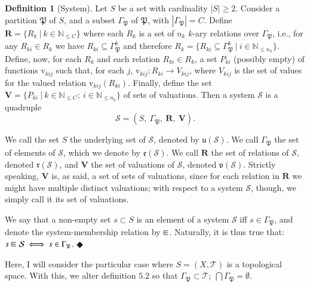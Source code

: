 \documentclass[12pt, a4paper]{article} %
\theoremstyle{definition}
\newtheorem{definition}{Definition}[section]
\newcommand{\N}{\mathbb{N}}
\newcommand\sqin{\mathrel{\raisebox{0.1ex}{\ooalign{$\sqsubset$\cr $-$}}}}
\begin{document}
	\begin{definition}[System] \label{sys} Let $S$ be a set with cardinality $|S| \geq 2$. Consider a partition $\mathfrak{P}$ of $S$, and a subset $\Gamma_{\mathfrak{P}}$ of $\mathfrak{P}$, with $|\Gamma_{\mathfrak{P}}| = C$. Define $\mathbf{R} = \{R_k \ | \ k \in \N_{\leq C} \}$ where each $R_k$ is a set of $n_k$ $k$-ary relations over $\Gamma_{\mathfrak{P}}$, i.e., for any $R_{ki} \in R_k$ we have $R_{ki} \subseteq \Gamma_{\mathfrak{P}}^k$ and therefore $R_k = \{R_{ki} \subseteq \Gamma_{\mathfrak{P}}^k\ | \ i \in \N_{\leq n_k}\}$.  Define, now, for each $R_k$ and each relation $R_{ki} \in R_k$, a set $P_{ki}$ (possibly empty) of functions $\mathrm{v}_{kij}$ such that, for each $j$, $\mathrm{v}_{kij}: R_{ki} \rightarrow V_{kij}$, where $V_{kij}$ is the set of values for the valued relation $\mathrm{v}_{kij}(R_{ki})$. Finally, define the set $\mathbf{V} = \{P_{ki} \ | \ k \in \N_{\leq C};\ i \in \N_{\leq n_k} \}$ of sets of valuations. Then a system $\mathcal{S}$ is a quadruple
		\[ \mathcal{S} = (S,\ \Gamma_{\mathfrak{P}}, \ \mathbf{R},\ \mathbf{V}).\]
		
		\noindent
		We call the set $S$ the underlying set of $\mathcal{S}$, denoted by $\mathfrak{u}(\mathcal{S})$. We call $\Gamma_{\mathfrak{P}}$ the set of elements of $\mathcal{S}$, which we denote by $\mathfrak{e}(\mathcal{S})$. We call $\mathbf{R}$ the set of relations of $\mathcal{S}$, denoted $\mathfrak{r}(\mathcal{S})$, and $\mathbf{V}$ the set of valuations of $\mathcal{S}$, denoted $\mathfrak{v}(\mathcal{S})$. Strictly speaking, $\mathbf{V}$ is, as said, a set of sets of valuations, since for each relation in $\mathbf{R}$ we might have multiple distinct valuations; with respect to a system $\mathcal{S}$, though, we simply call it its set of valuations. 
		
		We say that a non-empty set $s \subset S$ is an element of a system $\mathcal{S}$ iff $s \in \Gamma_{\mathfrak{P}}$, and denote the system-membership relation by $\sqin$. Naturally, it is thus true that: $s \sqin \mathcal{S} \iff s \in \Gamma_{\mathfrak{P}}$. $\Diamondblack$ %
	\end{definition}
	
	Here, I will consider the particular case where $S = (X, \mathcal{T})$ is a topological space. With this, we alter definition $5.2$ so that $\Gamma_{\mathfrak{P}} \subset \mathcal{T}; \ \bigcap \Gamma_{\mathfrak{P}} = \emptyset$.
	
\end{document}
